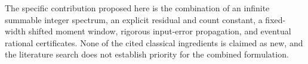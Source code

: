 The specific contribution proposed here is the combination of an infinite
summable integer spectrum, an explicit residual and count constant, a
fixed-width shifted moment window, rigorous input-error propagation, and
eventual rational certificates. None of the cited classical ingredients is
claimed as new, and the literature search does not establish priority for
the combined formulation.
